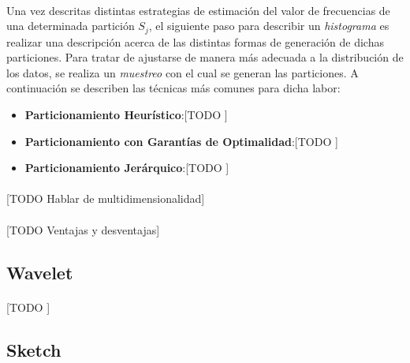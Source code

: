 \documentclass{subfiles}
\begin{document}
        \paragraph{}
        Una vez descritas distintas estrategias de estimación del valor de frecuencias de una determinada partición $S_j$, el siguiente paso para describir un \emph{histograma} es realizar una descripción acerca de las distintas formas de generación de dichas particiones. Para tratar de ajustarse de manera más adecuada a la distribución de los datos, se realiza un \emph{muestreo} con el cual se generan las particiones. A continuación se describen las técnicas más comunes para dicha labor:

        \begin{itemize}

          \item \textbf{Particionamiento Heurístico}:[TODO ]

          \item \textbf{Particionamiento con Garantías de Optimalidad}:[TODO ]

          \item \textbf{Particionamiento Jerárquico}:[TODO ]

        \end{itemize}

        \paragraph{}
        [TODO Hablar de multidimensionalidad]

        \paragraph{}
        [TODO Ventajas y desventajas]

      \subsection{Wavelet}
      \label{sec:wavelet}

        \paragraph{}
        [TODO ]

      \subsection{Sketch}
      \label{sec:sketch}
\end{document}
